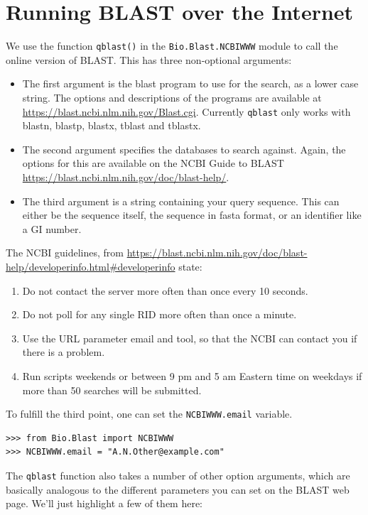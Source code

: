 \section{Running BLAST over the Internet}

We use the function \verb|qblast()| in the \verb|Bio.Blast.NCBIWWW| module
to call the online version of BLAST.  This has three non-optional arguments:
\begin{itemize}
\item The first argument is the blast program to use for the search, as a
lower case string. The options and descriptions of the programs are
available at \url{https://blast.ncbi.nlm.nih.gov/Blast.cgi}.
Currently \verb|qblast| only works with blastn, blastp, blastx, tblast
and tblastx.
\item The second argument specifies the databases to search against. Again,
the options for this are available on the NCBI Guide to BLAST
\url{https://blast.ncbi.nlm.nih.gov/doc/blast-help/}.
\item The third argument is a string containing your query sequence.  This
can either be the sequence itself, the sequence in fasta format,
or an identifier like a GI number.
\end{itemize}

The NCBI guidelines, from \url{https://blast.ncbi.nlm.nih.gov/doc/blast-help/developerinfo.html#developerinfo} state:
\begin{enumerate}
\item Do not contact the server more often than once every 10 seconds.
\item Do not poll for any single RID more often than once a minute.
\item Use the URL parameter email and tool, so that the NCBI can contact you if there is a problem.
\item Run scripts weekends or between 9 pm and 5 am Eastern time on weekdays if more than 50 searches will be submitted.
\end{enumerate}

To fulfill the third point, one can set the \verb|NCBIWWW.email| variable.
\begin{verbatim}
>>> from Bio.Blast import NCBIWWW
>>> NCBIWWW.email = "A.N.Other@example.com"
\end{verbatim}

The \verb|qblast| function also takes a number of other option arguments,
which are basically analogous to the different parameters you can set
on the BLAST web page.  We'll just highlight a few of them here:

